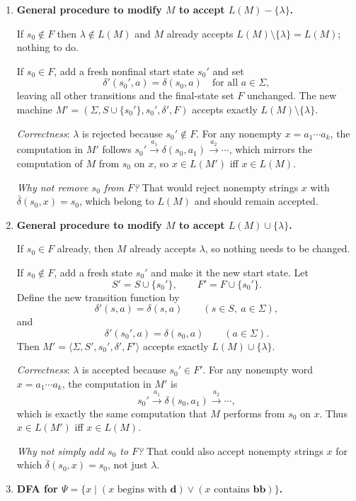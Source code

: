 \documentclass[11pt,openany]{book}
\def\DBAR{\ensuremath{\overline{\delta}}}
\begin{document}
\begin{enumerate}[{1.}1.]
\item \textbf{General procedure to modify $M$ to accept $L(M)-\{\lambda\}$.}

If $s_0 \notin F$ then $\lambda\notin L(M)$ and $M$ already accepts $L(M)\setminus\{\lambda\}=L(M)$; nothing to do.

If $s_0\in F$, add a fresh nonfinal start state $s_0'$ and set
\[
  \delta'(s_0',a)=\delta(s_0,a)\quad\text{for all }a\in\Sigma,
\]
leaving all other transitions and the final-state set $F$ unchanged.
The new machine $M'=(\Sigma,S\cup\{s_0'\},s_0',\delta',F)$ accepts exactly $L(M)\setminus\{\lambda\}$.

\emph{Correctness}: $\lambda$ is rejected because $s_0'\notin F$. For any nonempty $x=a_1\cdots a_k$, the computation in $M'$ follows $s_0'\xrightarrow{a_1}\delta(s_0,a_1)\xrightarrow{a_2}\cdots$, which mirrors the computation of $M$ from $s_0$ on $x$, so $x\in L(M')$ iff $x\in L(M)$.

\emph{Why not remove $s_0$ from $F$?} That would reject nonempty strings $x$ with $\bar\delta(s_0,x)=s_0$, which belong to $L(M)$ and should remain accepted.

\item \textbf{General procedure to modify $M$ to accept $L(M)\cup\{\lambda\}$.}

If $s_0\in F$ already, then $M$ already accepts $\lambda$, so nothing needs to be changed.

If $s_0\notin F$, add a fresh state $s_0'$ and make it the new start state. Let
\[
S' = S\cup\{s_0'\},\qquad F' = F\cup\{s_0'\}.
\]
Define the new transition function by
\[
\delta'(s,a)=\delta(s,a)\qquad (s\in S,\ a\in\Sigma),
\]
and
\[
\delta'(s_0',a)=\delta(s_0,a)\qquad (a\in\Sigma).
\]
Then $M'=\langle\Sigma,S',s_0',\delta',F'\rangle$ accepts exactly $L(M)\cup\{\lambda\}$.

\emph{Correctness}: $\lambda$ is accepted because $s_0'\in F'$. For any nonempty word $x=a_1\cdots a_k$, the computation in $M'$ is
\[
s_0'\xrightarrow{a_1}\delta(s_0,a_1)\xrightarrow{a_2}\cdots,
\]
which is exactly the same computation that $M$ performs from $s_0$ on $x$. Thus $x\in L(M')$ iff $x\in L(M)$.

\emph{Why not simply add $s_0$ to $F$?} That could also accept nonempty strings $x$ for which $\DBAR(s_0,x)=s_0$, not just $\lambda$.

\item \textbf{DFA for $\Psi = \{x\mid (x\text{ begins with }\mathbf{d})\vee(x\text{ contains }\mathbf{bb})\}$.}


\end{enumerate}
\end{document}
